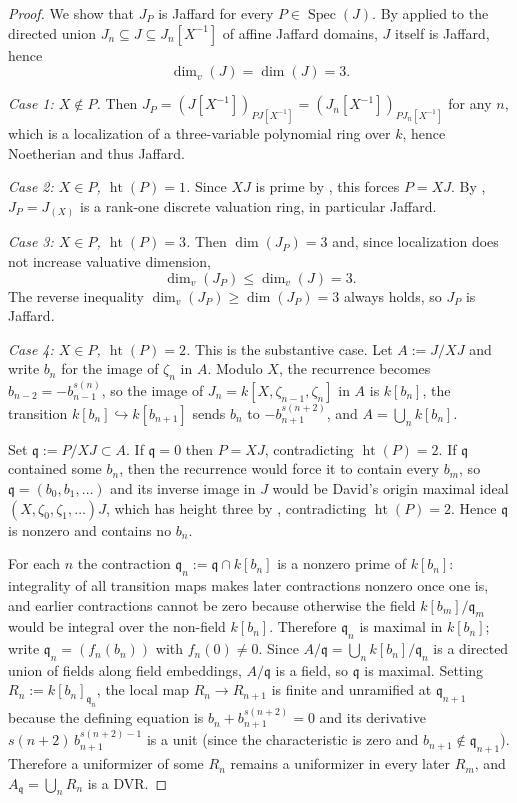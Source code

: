 \documentclass[11pt,reqno]{amsart}
\numberwithin{equation}{section}
\theoremstyle{definition}
\begin{document}
\begin{proof}
We show that $J_P$ is Jaffard for every $P\in\operatorname{Spec}(J)$.
By \cite[Theorem~2.3]{DobbsFontanaKabbaj1990} applied to the directed
union $J_n\subseteq J\subseteq J_n[X^{-1}]$ of affine Jaffard domains,
$J$ itself is Jaffard, hence
\[
   \dim_v(J)=\dim(J)=3.
\]

\smallskip
\noindent\emph{Case 1: $X\notin P$.} Then $J_P=(J[X^{-1}])_{PJ[X^{-1}]}
=(J_n[X^{-1}])_{PJ_n[X^{-1}]}$ for any $n$, which is a localization of a
three-variable polynomial ring over $k$, hence Noetherian and thus
Jaffard.

\smallskip
\noindent\emph{Case 2: $X\in P$, $\operatorname{ht}(P)=1$.} Since $XJ$ is
prime by \cite{David1973}, this forces $P=XJ$. By \cite[Lemma~2.3]{David1973}, $J_P=J_{(X)}$ is a rank-one discrete valuation ring,
in particular Jaffard.

\smallskip
\noindent\emph{Case 3: $X\in P$, $\operatorname{ht}(P)=3$.} Then
$\dim(J_P)=3$ and, since localization does not increase valuative
dimension,
\[
   \dim_v(J_P)\le\dim_v(J)=3.
\]
The reverse inequality $\dim_v(J_P)\ge\dim(J_P)=3$ always holds, so
$J_P$ is Jaffard.

\smallskip
\noindent\emph{Case 4: $X\in P$, $\operatorname{ht}(P)=2$.} This is the
substantive case. Let $A:=J/XJ$ and write $b_n$ for the image of
$\zeta_n$ in $A$. Modulo $X$, the recurrence becomes
$b_{n-2}=-b_{n-1}^{s(n)}$, so the image of $J_n=k[X,\zeta_{n-1},\zeta_n]$
in $A$ is $k[b_n]$, the transition $k[b_n]\hookrightarrow k[b_{n+1}]$
sends $b_n$ to $-b_{n+1}^{s(n+2)}$, and $A=\bigcup_n k[b_n]$.

Set $\mathfrak q:=P/XJ\subset A$. If $\mathfrak q=0$ then
$P=XJ$, contradicting $\operatorname{ht}(P)=2$. If $\mathfrak q$
contained some $b_n$, then the recurrence would force it to contain
every $b_m$, so $\mathfrak q=(b_0,b_1,\dots)$ and its inverse image in
$J$ would be David's origin maximal ideal
$(X,\zeta_0,\zeta_1,\dots)J$, which has height three by
\cite{David1973}, contradicting $\operatorname{ht}(P)=2$. Hence
$\mathfrak q$ is nonzero and contains no $b_n$.

For each $n$ the contraction $\mathfrak q_n:=\mathfrak q\cap k[b_n]$ is
a nonzero prime of $k[b_n]$: integrality of all transition maps makes
later contractions nonzero once one is, and earlier contractions cannot
be zero because otherwise the field $k[b_m]/\mathfrak q_m$ would be
integral over the non-field $k[b_n]$. Therefore $\mathfrak q_n$ is
maximal in $k[b_n]$; write $\mathfrak q_n=(f_n(b_n))$ with
$f_n(0)\ne 0$. Since $A/\mathfrak q=\bigcup_n k[b_n]/\mathfrak q_n$ is a
directed union of fields along field embeddings, $A/\mathfrak q$ is a
field, so $\mathfrak q$ is maximal. Setting $R_n:=k[b_n]_{\mathfrak q_n}$,
the local map $R_n\to R_{n+1}$ is finite and unramified at
$\mathfrak q_{n+1}$ because the defining equation is
$b_n+b_{n+1}^{s(n+2)}=0$ and its derivative
$s(n+2)\,b_{n+1}^{s(n+2)-1}$ is a unit (since the characteristic is
zero and $b_{n+1}\notin\mathfrak q_{n+1}$). Therefore a uniformizer of
some $R_n$ remains a uniformizer in every later $R_m$, and
$A_{\mathfrak q}=\bigcup_n R_n$ is a DVR.


\end{proof}
\end{document}

